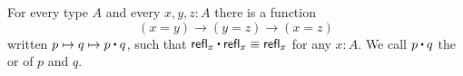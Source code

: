 \documentclass[hott-all.tex]{subfiles}
\begin{document}
%
%

\begin{lem}\label{lem:concat}
  For every type $A$ and every $x,y,z:A$ there is a function
  \begin{equation*}
  (x= y) \to   (y= z)\to (x=  z)
  \end{equation*}
  written $p \mapsto q \mapsto p\ct q$, such that $\refl{x}\ct \refl{x}\jdeq \refl{x}$ for any $x:A$.
  We call $p\ct q$ the  or  of $p$ and $q$.
\end{lem}
\end{document}
